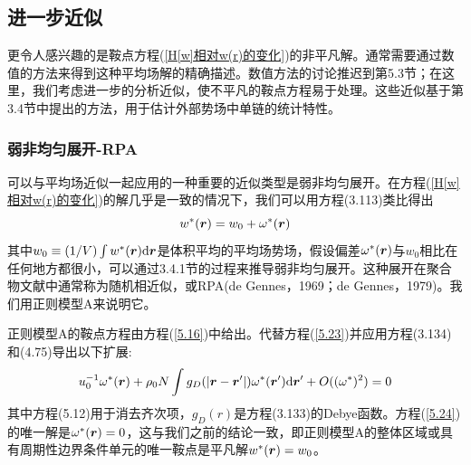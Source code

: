 \subsection{进一步近似}
更令人感兴趣的是鞍点方程(\ref{H[w]相对w(r)的变化})的非平凡解。通常需要通过数值的方法来得到这种平均场解的精确描述。数值方法的讨论推迟到第5.3节；在这里，我们考虑进一步的分析近似，使不平凡的鞍点方程易于处理。这些近似基于第3.4节中提出的方法，用于估计外部势场中单链的统计特性。
\subsubsection{弱非均匀展开-RPA}
可以与平均场近似一起应用的一种重要的近似类型是弱非均匀展开。在方程(\ref{H[w]相对w(r)的变化})的解几乎是一致的情况下，我们可以用方程(3.113)类比得出
\begin{equation}\label{5.23}
w^*(\bm{r})=w_0+\omega^*(\bm{r})
\end{equation}
其中$w_0\equiv(1/V)\int w^*(\bm{r})\mathrm{d}\bm{r}$是体积平均的平均场势场，假设偏差$\omega^*(\bm{r})$与$w_0$相比在任何地方都很小，可以通过3.4.1节的过程来推导弱非均匀展开。这种展开在聚合物文献中通常称为随机相近似，或RPA(de Gennes，1969；de Gennes，1979)。我们用正则模型A来说明它。

正则模型A的鞍点方程由方程(\ref{5.16})中给出。代替方程(\ref{5.23})并应用方程(3.134)和(4.75)导出以下扩展:
\begin{equation}\label{5.24}
u_0^{-1}\omega^*(\bm{r})+\rho_0N\int g_D(\left|\bm{r}-\bm{r}'\right|)\omega^*(\bm{r}')\mathrm{d}\bm{r}'+O((\omega^*)^2)=0
\end{equation}
其中方程(5.12)用于消去齐次项，$g_D(r)$是方程(3.133)的Debye函数。方程(\ref{5.24})的唯一解是$\omega^*(\bm{r})=0$，这与我们之前的结论一致，即正则模型A的整体区域或具有周期性边界条件单元的唯一鞍点是平凡解$w^*(\bm{r})=w_0$。

